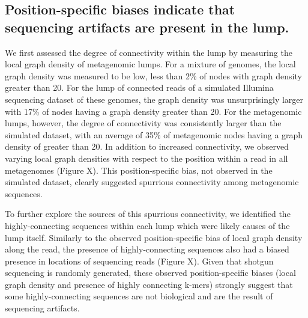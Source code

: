 \documentclass[11pt]{article} %
\begin{document}
\subsection{Position-specific biases indicate that sequencing artifacts are present in the lump.}
We first assessed the degree of connectivity within the lump by measuring the local graph density of metagenomic lumps.  For a mixture of genomes, the local graph density was measured to be low, less than 2\% of nodes with graph density greater than 20.  For the lump of connected reads of a simulated Illumina sequencing dataset of these genomes, the graph density was unsurprisingly larger with 17\% of nodes having a graph density greater than 20.   For the metagenomic lumps, however, the degree of connectivity was consistently larger than the simulated dataset, with an average of 35\% of metagenomic nodes having a graph density of greater than 20.   In addition to increased connectivity, we observed varying local graph densities with respect to the position within a read in all metagenomes (Figure X).  This position-specific bias, not observed in the simulated dataset, clearly suggested spurrious connectivity among metagenomic sequences.  

To further explore the sources of this spurrious connectivity, we identified the highly-connecting sequences within each lump which were likely causes of the lump itself.  Similarly to the observed position-specific bias of local graph density along the read, the presence of highly-connecting sequences also had a biased presence in locations of sequencing reads (Figure X).  Given that shotgun sequencing is randomly generated, these observed position-specific biases (local graph density and presence of highly connecting k-mers) strongly suggest that some highly-connecting sequences are not biological and are the result of sequencing artifacts.  
\end{document}
